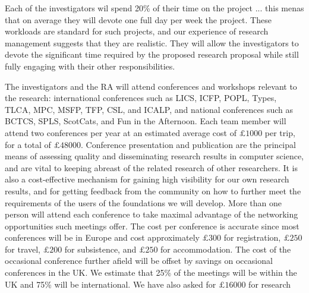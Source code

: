 \documentclass[a4paper,11pt]{article}
\begin{document}
\vspace{0.02in}

Each of the investigators wil spend 20\% of their time on the project
... this menas that on average they will devote one
full day per week the project. These workloads are standard for such projects, and
our experience of research management suggests that they are
realistic. They will allow the investigators to devote the significant
time required by the proposed research proposal while still fully
engaging with their other responsibilities.

\vspace{0.02in}

 The investigators and the RA will
attend conferences and workshops relevant to the research:
international conferences such as LICS, ICFP, POPL, Types, TLCA, MPC,
MSFP, TFP, CSL, and ICALP, and national conferences such as BCTCS,
SPLS, ScotCats, and Fun in the Afternoon. Each team member will
attend two conferences per year at an estimated average cost of
$\pounds 1000$ per trip, for a total of $\pounds 48000$. Conference
presentation and publication are the principal
means of assessing quality and disseminating
research results in computer science, and are vital to
keeping abreast of the related research of other researchers. It is
also a cost-effective mechanism for gaining high visibility for our
own research results, and for getting feedback from the community on
how to further meet the requirements of the users of the foundations
we will develop.
More than one person
will attend each conference to take maximal advantage of the
networking opportunities such meetings offer. The cost per conference
is accurate since most conferences will be in Europe and cost
approximately $\pounds 300$ for registration, $\pounds 250$ for
travel, $\pounds 200$ for subsistence, and $\pounds 250$ for
accommodation. The cost of the occasional conference further afield
will be offset by savings on occasional conferences in the UK. We
estimate that 25\% of the meetings will be within the UK and 75\% will
be international.  We have also asked for $\pounds 16000$ for research
\end{document}
